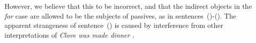
However, we believe that this to be incorrect, and that the indirect objects in
the {\it for} case are allowed to be the subjects of passives, as in
sentences~()-().  The apparent strangeness of sentence~() is
caused by interference from other interpretations of {\it Clove was made
dinner .}




